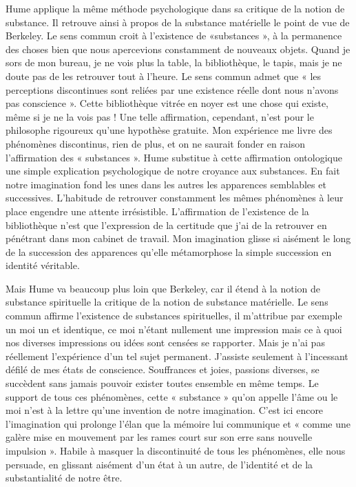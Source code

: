 Hume applique la même méthode psychologique dans sa
critique de la notion de substance. Il retrouve ainsi à propos
de la substance matérielle le point de vue de Berkeley. Le
sens commun croit à l’existence de «substances », à la permanence 
des choses bien que nous apercevions constamment
de nouveaux objets. Quand je sors de mon bureau, je ne vois
plus la table, la bibliothèque, le tapis, mais je ne doute
pas de les retrouver tout à l’heure. Le sens commun admet
que « les perceptions discontinues sont reliées par une
existence réelle dont nous n’avons pas conscience ». Cette
bibliothèque vitrée en noyer est une chose qui existe,
même si je ne la vois pas ! Une telle affirmation, cependant,
n’est pour le philosophe rigoureux qu’une hypothèse
gratuite. Mon expérience me livre des phénomènes discontinus, rien de plus, et on ne saurait fonder en raison
l'affirmation des « substances ». Hume substitue à cette
affirmation ontologique une simple explication psychologique 
de notre croyance aux substances. En fait notre
imagination fond les unes dans les autres les apparences
semblables et successives. L’habitude de retrouver constamment 
les mêmes phénomènes à leur place engendre une
attente irrésistible. L’affirmation de l'existence de la
bibliothèque n’est que l'expression de la certitude que
j'ai de la retrouver en pénétrant dans mon cabinet de
travail. Mon imagination glisse si aisément le long de la
succession des apparences qu’elle métamorphose la simple
succession en identité véritable.

Mais Hume va beaucoup plus loin que Berkeley, car il
étend à la notion de substance spirituelle la critique de la
notion de substance matérielle. Le sens commun affirme
l'existence de substances spirituelles, il m’attribue par
exemple un moi un et identique, ce moi n’étant nullement
une impression mais ce à quoi nos diverses impressions ou
idées sont censées se rapporter. Mais je n’ai pas réellement
l'expérience d’un tel sujet permanent. J’assiste seulement à
l’incessant défilé de mes états de conscience. Souffrances et
joies, passions diverses, se succèdent sans jamais pouvoir
exister toutes ensemble en même temps. Le support de tous
ces phénomènes, cette « substance » qu’on appelle l'âme ou
le moi n’est à la lettre qu’une invention de notre imagination.
C’est ici encore l’imagination qui prolonge l’élan que la
mémoire lui communique et « comme une galère mise en
mouvement par les rames court sur son erre sans nouvelle
impulsion ». Habile à masquer la discontinuité de tous les phénomènes, elle nous persuade, en glissant aisément d’un état
à un autre, de l'identité et de la substantialité de notre être.

